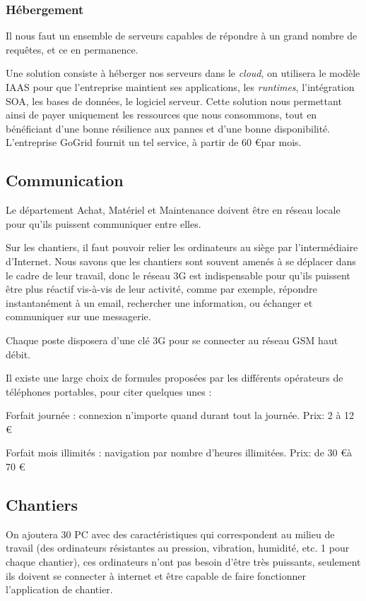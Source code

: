 	\subsubsection{Hébergement}
    Il nous faut un ensemble de serveurs capables de répondre à un grand
    nombre de requêtes, et ce en permanence.

Une solution consiste à héberger nos serveurs dans le \textsl{cloud}, on
utilisera le modèle IAAS pour  que l'entreprise maintient ses applications,
les {\sl runtimes}, l'intégration SOA, les bases de données, le logiciel
serveur.  Cette solution nous permettant ainsi de payer uniquement les
ressources que nous consommons, tout en bénéficiant d'une bonne résilience
aux pannes et d'une bonne disponibilité.  L'entreprise GoGrid fournit un
tel service, à partir de 60 \euro par mois.


\subsection{Communication}
Le département Achat, Matériel et Maintenance doivent être en réseau locale
pour qu'ils puissent  communiquer entre elles.

Sur les chantiers, il faut pouvoir relier les ordinateurs au siège par
l'intermédiaire d'Internet.  Nous savons que les chantiers sont souvent
amenés à se déplacer dans le cadre de leur travail, donc le réseau 3G est
indispensable pour qu'ils puissent être plus réactif vis-à-vis de leur
activité, comme par exemple, répondre instantanément à un email, rechercher
une information, ou échanger et communiquer sur une messagerie. 

Chaque poste disposera d’une clé 3G pour se connecter au réseau GSM haut
débit.

Il existe une large choix de formules proposées par les différents
opérateurs de téléphones portables, pour citer quelques unes :

Forfait journée : connexion n'importe quand durant tout la journée. Prix: 2 à
12 \euro

Forfait mois illimités : navigation par nombre d'heures illimitées.  Prix:
de 30 \euro à 70 \euro


\subsection{Chantiers}
On ajoutera 30 PC avec des caractéristiques qui correspondent au milieu de
travail (des ordinateurs résistantes au pression, vibration, humidité, etc.
1 pour chaque chantier), ces ordinateurs n'ont pas besoin d’être très
puissants, seulement ils doivent se connecter à internet et être capable de
faire fonctionner l'application de chantier.

